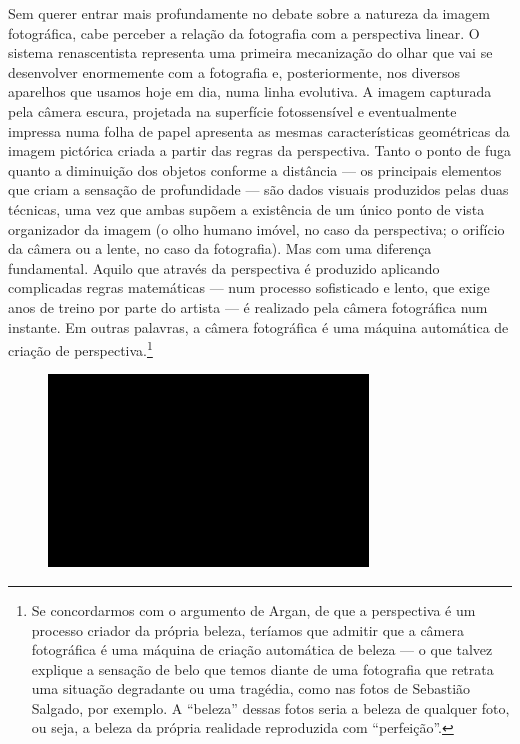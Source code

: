 Sem querer entrar mais profundamente no debate sobre a natureza da
imagem fotográfica, cabe perceber a relação da fotografia com a
perspectiva linear. O sistema renascentista representa uma primeira
mecanização do olhar que vai se desenvolver enormemente com a fotografia
e, posteriormente, nos diversos aparelhos que usamos hoje em dia, numa
linha evolutiva. A imagem capturada pela câmera escura, projetada na
superfície fotossensível e eventualmente impressa numa folha de papel
apresenta as mesmas características geométricas da imagem pictórica
criada a partir das regras da perspectiva. Tanto o ponto de fuga quanto
a diminuição dos objetos conforme a distância --- os principais elementos
que criam a sensação de profundidade --- são dados visuais produzidos
pelas duas técnicas, uma vez que ambas supõem a existência de um único
ponto de vista organizador da imagem (o olho humano imóvel, no caso da
perspectiva; o orifício da câmera ou a lente, no caso da fotografia).
Mas com uma diferença fundamental. Aquilo que através da perspectiva é
produzido aplicando complicadas regras matemáticas --- num processo
sofisticado e lento, que exige anos de treino por parte do artista --- é
realizado pela câmera fotográfica num instante. Em outras palavras, a
câmera fotográfica é uma máquina automática de criação de
perspectiva.\footnote{Se concordarmos com o argumento de Argan, de que a
  perspectiva é um processo criador da própria beleza, teríamos que
  admitir que a câmera fotográfica é uma máquina de criação automática
  de beleza --- o que talvez explique a sensação de belo que temos diante
  de uma fotografia que retrata uma situação degradante ou uma tragédia,
  como nas fotos de Sebastião Salgado, por exemplo. A ``beleza'' dessas
  fotos seria a beleza de qualquer foto, ou seja, a beleza da própria
  realidade reproduzida com ``perfeição''.}

\begin{figure}[!ht]
\centering
 \includegraphics[width=85mm]{./imgs/im1.jpg}
\caption{\tiny{}}
\end{figure}

